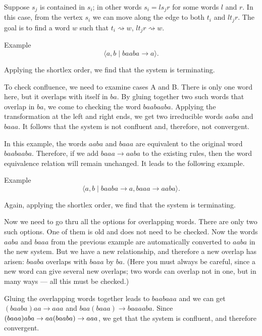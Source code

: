  Suppose  $s_{j}$ is contained in $s_{i}$;
in other words $s_i=ls_{j}r$ for some words $l$ and $r$.
In this case, from the vertex $s_{i}$ we can move along the edge to both $t_{i}$ and $lt_{j}r$.
The goal is to find a word $w$ such that $t_{i}\rightsquigarrow w$, $lt_{j}r\rightsquigarrow w$.


\begin{thm}{Example}\label{em:baaba>a}
\[\langle a,b \mid baaba\to a\rangle.\]
\end{thm}

Applying the shortlex order, we find that the system is terminating.

To check confluence, we need to examine cases A and B.
There is only one word here, but it overlaps with itself in $ba$.
By gluing together two such words that overlap in $ba$, we come to checking the word $baabaaba$.
Applying the transformation at the left and right ends, we get two irreducible words
$aaba$ and $baaa$.
It follows that the system is not confluent and, therefore, not convergent.

\medskip

In this example, the words $aaba$ and $baaa$ are equivalent to the original word $baabaaba$.
Therefore, if we add $baaa\to aaba$ to the existing rules, then the word equivalence relation will remain unchanged.
It leads to the following example.

\begin{thm}{Example}\label{em:baaba>a,baaa>aaba}
\[\langle a, b \mid baaba\to a, baaa\to aaba\rangle.\]
\end{thm}

Again, applying the shortlex order, we find that the system is terminating.

Now we need to go thru all the options for overlapping words.
There are only two such options.
One of them is old and does not need to be checked.
Now the words $aaba$ and $baaa$ from the previous example are automatically converted to $aaba$ in the new system.
But we have a new relationship, and therefore a new overlap has arisen: $baaba$ overlaps with $baaa$ by $ba$. (Here you must always be careful, since a new word can give several new overlaps;
two words can overlap not in one, but in many ways --- all this must be checked.)

Gluing the overlapping words together leads to $baabaaa$
and we can get $(baaba)aa\to aaa$
and $baa(baaa)\to baaaaba$.
Since $(baaa)aba \to  aa(baaba) \to aaa$, we get that the system is confluent,
and therefore convergent.

